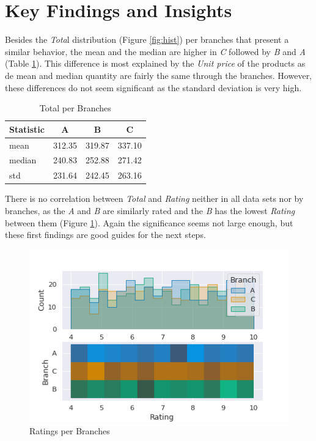 \documentclass[11pt, a4]{article}
\begin{document}
\section*{Key Findings and Insights}

Besides the \textit{Tota}l distribution (Figure \ref{fig:hist}) per branches that present a similar behavior, the mean and the median are higher in \textit{C} followed by \textit{B} and \textit{A} (Table \ref{table:2}). This difference is most explained by the \textit{Unit price} of the products as de mean and median quantity are fairly the same through the branches. However, these differences do not seem significant as the standard deviation is very high.


\begin{table}[h!]
\centering
\begin{tabular}{l c c c}
\toprule
\textbf{Statistic} & \textbf{A} & \textbf{B} & \textbf{C} \\
\midrule
mean &	312.35& 	319.87& 	337.10\\
median& 	240.83& 	252.88& 	271.42\\
std 	&231.64 	&242.45& 	263.16\\
\bottomrule
\end{tabular}
\caption{Total per Branches}
\label{table:2}
\end{table}

There is no correlation between \textit{Total} and \textit{Rating} neither in all data sets nor by branches, as the \textit{A} and \textit{B} are similarly rated and the \textit{B} has the lowest \textit{Rating} between them (Figure \ref{fig:rating}). Again the significance seems not large enough, but these first findings are good guides for the next steps. 

\begin{figure}[!h]
\includegraphics[]{rating}
\centering
\caption{Ratings per Branches}
\label{fig:rating}
\end{figure}
\end{document}
